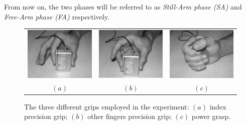 From now on, the two phases will be referred to as \emph{Still-Arm
phase (SA)} and \emph{Free-Arm phase (FA)} respectively.

\begin{figure}[!t] \centering
  \begin{tabular}{ccc}
   \includegraphics[height=0.16\textheight]{figs/grip1} &
    \includegraphics[height=0.16\textheight]{figs/grip2} &
    \includegraphics[height=0.16\textheight]{figs/grip3} \\
    $(a)$ & $(b)$ & $(c)$ \\
  \end{tabular}
  \caption{The three different grips employed in the experiment: $(a)$
   index precision grip; $(b)$ other fingers precision grip; $(c)$
   power grasp.}
  \label{fig:Grasps}
\end{figure}

